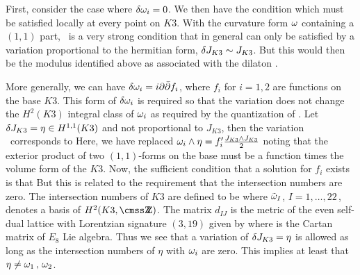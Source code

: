 First, consider the case where $\delta \omega_i =0$.  We then have the
condition \eqn{}
 which must be satisfied locally at
every point on $K3$.  With the curvature form $\omega$ containing a
$(1,1)$ part, \curvsp\ is a very strong condition that in general
can only be satisfied by a variation proportional to the hermitian
form, $\delta J_{K3} \sim J_{K3}$.  But this would then be the modulus
identified above as associated with the dilaton \dilv.

More generally, we can have $\delta \omega_i  = i \partial {\bar \partial} f_i$, where
$f_i$ for $i=1,2$ are functions on the base $K3$. This form of $\delta
\omega_i $ is required so that the variation does not change the
$H^2(K3)$ integral class of $\omega_i$ as required by the
quantization of \bv. Let $\delta J_{K3}= \eta \in H^{1,1}(K3)$ and not proportional to $J_{K3}$, then
the variation \curvar\ corresponds to
\eqn{} Here, we
have replaced $\omega_i \wedge \eta = f'_i {J_{K3} \wedge J_{K3} \over 2}$ noting
that the exterior product of two $(1,1)$-forms on the base must be
a function times the volume form of the $K3$.  Now, the sufficient
condition that a solution for $f_i$ exists is that
\eqn{}   But this is related to the requirement that the
intersection numbers are zero. The intersection numbers of $K3$
are defined to be \eqn{} where ${\tilde \omega}_I$, $I=1,\ldots,22\,$, denotes a basis of
$H^2(K3,\ZZ)$. The matrix $d_{IJ}$ is the metric of the even
self-dual lattice with Lorentzian signature $(3,19)$ given by
\eqn{} where
\eqn{} is the Cartan matrix of $E_8$ Lie algebra.
Thus we see that a variation of $\delta J_{K3} = \eta$ is allowed as long
as the intersection numbers of $\eta$ with $\omega_i$ are zero. This
implies at least that $\eta \neq \omega_1\, ,\, \omega_2$.

